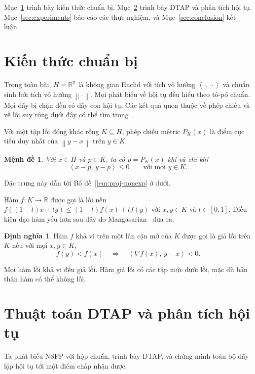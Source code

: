 \documentclass[]{interact}
\theoremstyle{plain}
\newtheorem{proposition}[theorem]{Mệnh đề}
\theoremstyle{definition}
\newtheorem{definition}[theorem]{Định nghĩa}
\theoremstyle{remark}
\newcommand{\R}{\mathbb{R}}
\newcommand{\norm}[1]{\left\lVert #1 \right\rVert}
\newcommand{\inner}[2]{\left\langle #1,\, #2 \right\rangle}
\newcommand{\dtap}{\textsc{DTAP}}
\begin{document}
Mục~\ref{sec:prelim} trình bày kiến thức chuẩn bị. Mục~\ref{sec:convergence} trình bày \dtap{} và phân tích hội tụ. Mục~\ref{sec:experiments} báo cáo các thực nghiệm, và Mục~\ref{sec:conclusion} kết luận.


\section{Kiến thức chuẩn bị}\label{sec:prelim}
Trong toàn bài, $H=\R^n$ là không gian Euclid với tích vô hướng $\inner{\cdot}{\cdot}$ và chuẩn sinh bởi tích vô hướng $\norm{\cdot}$. Mọi phát biểu về hội tụ đều hiểu theo tô-pô chuẩn. Mọi dãy bị chặn đều có dãy con hội tụ. Các kết quả quen thuộc về phép chiếu và về lồi suy rộng dưới đây có thể tìm trong~\citep{bauschke2011,mangasarian1994}.

Với một tập lồi đóng khác rỗng $K\subseteq H$, phép chiếu mêtric $P_K(x)$ là điểm cực tiểu duy nhất của $\norm{y-x}$ trên $y\in K$.
\begin{proposition}\label{prop:proj-char}
Với $x\in H$ và $p\in K$, ta có $p=P_K(x)$ khi và chỉ khi
\begin{equation}\label{eq:proj-char}
\inner{x-p}{y-p}\le0\qquad\text{với mọi }y\in K.
\end{equation}
\end{proposition}
Đặc trưng này dẫn tới Bổ đề~\ref{lem:proj-nonexp} ở dưới.

Hàm $f:K\to\R$ được gọi là lồi nếu
$f((1-t)x+ty)\le(1-t)f(x)+tf(y)$ với $x,y\in K$ và $t\in[0,1]$.
Điều kiện đạo hàm yếu hơn sau đây do Mangasarian~\citep{mangasarian1965} đưa ra.
\begin{definition}\label{def:pseudoconvex}
Hàm $f$ khả vi trên một lân cận mở của $K$ được gọi là giả lồi trên $K$ nếu với mọi $x,y\in K$,
\begin{equation}\label{eq:contrapositive}
f(y)<f(x)\quad\Longrightarrow\quad\inner{\nabla f(x)}{y-x}<0.
\end{equation}
\end{definition}
Mọi hàm lồi khả vi đều giả lồi. Hàm giả lồi có các tập mức dưới lồi, mặc dù bản thân hàm có thể không lồi.

\section{Thuật toán DTAP và phân tích hội tụ}\label{sec:convergence}
Ta phát biểu NSFP với hộp chuẩn, trình bày DTAP, và chứng minh toàn bộ dãy lặp hội tụ
tới một điểm chấp nhận được.
\end{document}
